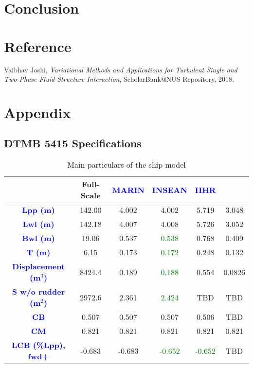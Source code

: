 \documentclass[12pt]{article} %
\begin{document}
\section{Conclusion}



\section{Reference}
\begin{thebibliography}{99}
    Vaibhav Joshi, \emph{Variational Methods and Applications for Turbulent Single and Two-Phase Fluid-Structure Interaction}, ScholarBank@NUS Repository, 2018.
\end{thebibliography}

\section{Appendix}
\subsection{DTMB 5415 Specifications}
\begin{table}[h!]
    \centering
    \begin{tabular}{|c|c|c|c|c|c|}
        \hline
        & \textbf{Full-Scale} & \textbf{\textcolor{blue}{MARIN}} & \textbf{\textcolor{blue}{INSEAN}} & \textbf{\textcolor{blue}{IIHR}} &\\ \hline
        \textbf{\textcolor{blue}{Lpp (m)}} & 142.00 & 4.002 & 4.002 & 5.719 & 3.048 \\ \hline
        \textbf{\textcolor{blue}{Lwl (m)}} & 142.18 & 4.007 & 4.008 & 5.726 & 3.052 \\ \hline
        \textbf{\textcolor{blue}{Bwl (m)}} & 19.06 & 0.537 & \textcolor{green}{0.538} & 0.768 & 0.409 \\ \hline
        \textbf{\textcolor{blue}{T (m)}} & 6.15 & 0.173 & \textcolor{green}{0.172} & 0.248 & 0.132 \\ \hline
        \textbf{\textcolor{blue}{Displacement (m\(^3\))}} & 8424.4 & 0.189 & \textcolor{green}{0.188} & 0.554 & 0.0826 \\ \hline
        \textbf{\textcolor{blue}{S w/o rudder (m\(^2\))}} & 2972.6 & 2.361 & \textcolor{green}{2.424} & TBD & TBD \\ \hline
        \textbf{\textcolor{blue}{CB}} & 0.507 & 0.507 & 0.507 & 0.506 & TBD \\ \hline
        \textbf{\textcolor{blue}{CM}} & 0.821 & 0.821 & 0.821 & 0.821 & 0.821 \\ \hline
        \textbf{\textcolor{blue}{LCB (\%Lpp), fwd+}} & -0.683 & -0.683 & \textcolor{green}{-0.652} & \textcolor{green}{-0.652} & TBD \\ \hline
    \end{tabular}
    \caption{Main particulars of the ship model}
    \label{tab:main_particulars}
\end{table}
\end{document}
